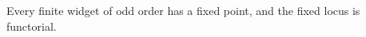 \begin{mainthm}\label{sy-000B}
Every finite widget of odd order has a fixed point, and the fixed locus is functorial.
\end{mainthm}
